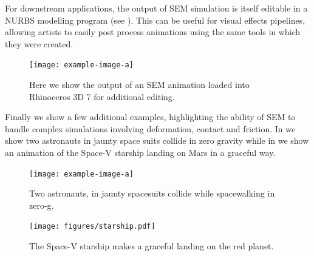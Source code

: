 

For downstream applications, the output of  SEM simulation is itself editable in a NURBS modelling program (see ). 
This can be useful for visual effects pipelines, allowing artists to easily post process animations using the same tools in which they were created.
\begin{figure}[h]
  \texttt{[image: example-image-a]}
  \caption{Here we show the output of an SEM animation loaded into Rhinoceros 3D 7 for additional editing.}
  \label{fig:edit}
\end{figure}

Finally we show a few additional examples, highlighting the ability of SEM to handle complex simulations involving deformation, contact and friction.
In  we show two astronauts in jaunty space suits collide in zero gravity while in  
we show an animation of the Space-V starship landing on Mars in a graceful way.

\begin{figure}[htp]
  \texttt{[image: example-image-a]}
  \caption{Two astronauts, in jaunty spacesuits collide while spacewalking in zero-g.}
  \label{fig:staypuft}
\end{figure}

\begin{figure}[htp]
  \texttt{[image: figures/starship.pdf]}
  \caption{The Space-V starship makes a graceful landing on the red planet. }
  \label{fig:starship}
\end{figure}
